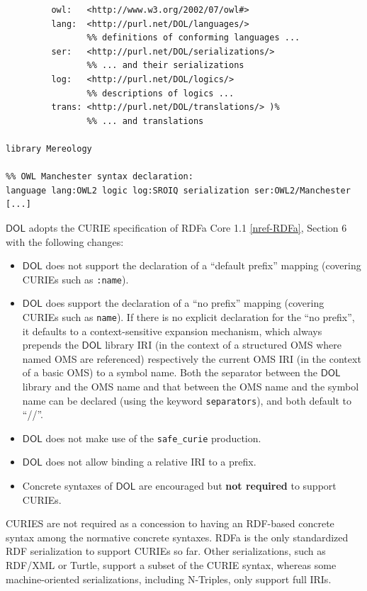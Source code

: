 \documentclass[10pt, a4paper]{isov2}
\makeatletter
\newcommand*\CommentAuthor{}
\renewcommand*\CommentAuthor{#1}}
\newcommand*\CommentDate{}
\renewcommand*\CommentDate{#1}}
\newcommand*\CommentId{}
\renewcommand*\CommentId{#1}}
\newcommand*\CommentType{}
\renewcommand*\CommentType{#1}}
\newcommand*{\SetCommentColorByType}[1]{%
\edef\localType{{#1}}%
\expandafter\ifstrequal\localType{q-aut}{\colorlet{CommentColor}{red}}{%
\expandafter\ifstrequal\localType{q-all}{\colorlet{CommentColor}{orange}}{%
\expandafter\ifstrequal\localType{todo}{\colorlet{CommentColor}{orange}}{%
\expandafter\ifstrequal\localType{fyi}{\colorlet{CommentColor}{lightgray}}{%
\colorlet{CommentColor}{yellow}}}}}}
\newcommand*{\SetCommentPrefixByType}[1]{%
\edef\localType{{#1}}%
\expandafter\@ifmtarg\localType{%
\edef\CommentPrefix{}%
}{%
\caseupper[q]{#1}%
\edef\CommentPrefix{\thestring: }%
}}
\newcommand*{\initComment}[1]{%
\setkeys{Comment}{#1}%
\SetCommentColorByType{\CommentType}%
\relax%
\SetCommentPrefixByType{\CommentType}%
\relax%
}
\newcommand*{\todonote}[2][]{%
\initComment{#1}%
\pdfcomment[author=\CommentAuthor,color=CommentColor,date=\CommentDate,id=\CommentId]{%
\CommentPrefix
#2}}
\renewcommand*{\todonote}[2][]{%
\initComment{#1}%
\ednote{\CommentPrefix #2}}
\newcommand*{\CLnote}[2][author=Christoph Lange]{%
\todonote[author=Christoph Lange,#1]{#2}}
\newcommand*{\syntax}[1]{\texttt{#1}}
\newcommand*{\notrequired}{\textbf{not required}\xspace}
\newcommand*{\DOL}{\ensuremath{\mathsf{DOL}}\xspace}
\renewcommand{\noterefname}{note}
\renewcommand{\nref}[1]{\noterefname~\ref{#1}}
\renewcommand{\nref}[1]{\ref{nref-#1}}
\makeatother
\begin{document}
\begin{lstlisting}[basicstyle=\ttfamily,language=dolText,escapechar=@,mathescape]
%prefix( :      <http://www.example.org/mereology#>
         owl:   <http://www.w3.org/2002/07/owl#>
         lang:  <http://purl.net/DOL/languages/>
                %% definitions of conforming languages ...
         ser:   <http://purl.net/DOL/serializations/>
                %% ... and their serializations
         log:   <http://purl.net/DOL/logics/>
                %% descriptions of logics ...
         trans: <http://purl.net/DOL/translations/> )%
                %% ... and translations

library Mereology

%% OWL Manchester syntax declaration: 
language lang:OWL2 logic log:SROIQ serialization ser:OWL2/Manchester
[...]
\end{lstlisting}


\DOL adopts the CURIE specification of RDFa Core 1.1 \nref{RDFa}, Section 6 with the following changes:
\begin{itemize}
\item \DOL does not support the declaration of a ``default prefix'' mapping %
(covering CURIEs such as \syntax{:name}).
\item \DOL does support the declaration  of a ``no prefix'' mapping (covering CURIEs such as 
\syntax{name}). If there is no explicit declaration for the ``no prefix'', it defaults to a 
context-sensitive expansion mechanism, which always prepends the \DOL library IRI (in the context of a 
structured OMS where named OMS are referenced) respectively the current OMS IRI (in the context of a basic
OMS) to a symbol name. Both the separator between the \DOL library and the OMS name and that between the 
OMS name and the symbol name can be declared (using the keyword \syntax{separators}), and both default to ``//''.

\item \DOL does not make use of the \syntax{safe\_curie} production.
\item \DOL does not allow binding a relative IRI to a prefix.
\item Concrete syntaxes of \DOL are encouraged but \notrequired to support CURIEs.
\end{itemize}

{CURIES are not required as 
a concession to having an RDF-based concrete syntax among the normative concrete syntaxes.  RDFa is 
the only standardized RDF serialization to support CURIEs so far.  Other serializations, such as 
RDF/XML or Turtle, support a subset of the CURIE syntax, whereas some machine-oriented 
serializations, including N-Triples, only support full IRIs.}
\end{document}
